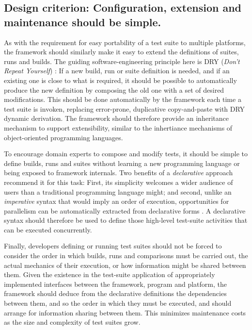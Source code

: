 \documentclass[conference]{IEEEtran}
\begin{document}
\subsection{Design criterion: Configuration, extension and maintenance should be simple.}

As with the requirement for easy portability of a test suite to multiple platforms, the framework should similarly make it easy to extend the definitions of suites, runs and builds. The guiding software-engineering principle here is DRY (\emph{Don't Repeat Yourself}) \cite{prags}: If a new build, run or suite definition is needed, and if an existing one is close to what is required, it should be possible to automatically produce the new definition by composing the old one with a set of desired modifications. This should be done automatically by the framework each time a test suite is invoken, replacing error-prone, duplicative copy-and-paste with DRY dynamic derivation. The framework should therefore provide an inheritance mechanism to support extensibility, similar to the inhertiance mechanisms of object-oriented programming languages.

To encourage domain experts to compose and modify tests, it should be simple to define builds, runs and suites without learning a new programming language or being exposed to framework internals. Two benefits of a \emph{declarative} approach recommend it for this task: First, its simplicity welcomes a wider audience of users than a traditional programming language might; and second, unlike an \emph{imperative} syntax that would imply an order of execution, opportunities for parallelism can be automatically extracted from declarative forms \cite{decl-advantages}. A declarative syntax should therefore be used to define those high-level test-suite activities that can be executed concurrently.

Finally, developers defining or running test suites should not be forced to consider the order in which builds, runs and comparisons must be carried out, the actual mechanics of their execution, or how information might be shared between them. Given the existence in the test-suite application of appropriately implemented interfaces between the framework, program and platform, the framework should deduce from the declarative definitions the dependencies between them, and so the order in which they must be executed, and should arrange for information sharing between them. This minimizes maintenance costs as the size and complexity of test suites grow.
\end{document}
